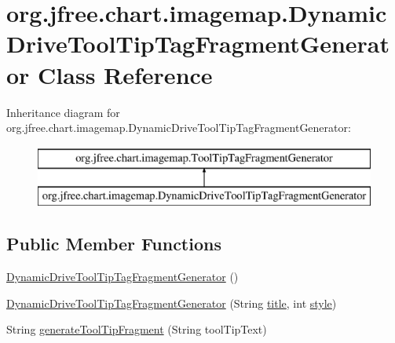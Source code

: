 \hypertarget{classorg_1_1jfree_1_1chart_1_1imagemap_1_1_dynamic_drive_tool_tip_tag_fragment_generator}{}\section{org.\+jfree.\+chart.\+imagemap.\+Dynamic\+Drive\+Tool\+Tip\+Tag\+Fragment\+Generator Class Reference}
\label{classorg_1_1jfree_1_1chart_1_1imagemap_1_1_dynamic_drive_tool_tip_tag_fragment_generator}
Inheritance diagram for org.\+jfree.\+chart.\+imagemap.\+Dynamic\+Drive\+Tool\+Tip\+Tag\+Fragment\+Generator\+:\begin{figure}[H]
\begin{center}
\leavevmode
\includegraphics[height=2.000000cm]{classorg_1_1jfree_1_1chart_1_1imagemap_1_1_dynamic_drive_tool_tip_tag_fragment_generator}
\end{center}
\end{figure}
\subsection*{Public Member Functions}
\begin{DoxyCompactItemize}
\item 
\mbox{\hyperlink{classorg_1_1jfree_1_1chart_1_1imagemap_1_1_dynamic_drive_tool_tip_tag_fragment_generator_a8066e875d5bd28de059dbe39d519119e}{Dynamic\+Drive\+Tool\+Tip\+Tag\+Fragment\+Generator}} ()
\item 
\mbox{\hyperlink{classorg_1_1jfree_1_1chart_1_1imagemap_1_1_dynamic_drive_tool_tip_tag_fragment_generator_adb02f355ca64d77ab671406d5f928888}{Dynamic\+Drive\+Tool\+Tip\+Tag\+Fragment\+Generator}} (String \mbox{\hyperlink{classorg_1_1jfree_1_1chart_1_1imagemap_1_1_dynamic_drive_tool_tip_tag_fragment_generator_a44b18cbee5e91278dce5646453e80300}{title}}, int \mbox{\hyperlink{classorg_1_1jfree_1_1chart_1_1imagemap_1_1_dynamic_drive_tool_tip_tag_fragment_generator_ab59865f9d9c46d5e4b171ed26e640457}{style}})
\item 
String \mbox{\hyperlink{classorg_1_1jfree_1_1chart_1_1imagemap_1_1_dynamic_drive_tool_tip_tag_fragment_generator_a5a943646164a635e6e7bb0c2960a3712}{generate\+Tool\+Tip\+Fragment}} (String tool\+Tip\+Text)
\end{DoxyCompactItemize}
